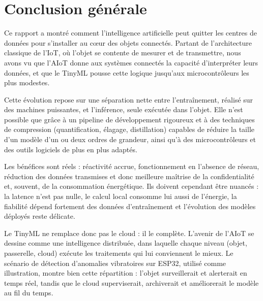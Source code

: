 \chapter*{Conclusion générale}

Ce rapport a montré comment l'intelligence artificielle peut quitter les
centres de données pour s'installer au cœur des objets connectés. Partant de
l'architecture classique de l'IoT, où l'objet se contente de mesurer et de
transmettre, nous avons vu que l'AIoT donne aux systèmes connectés la capacité
d'interpréter leurs données, et que le TinyML pousse cette logique jusqu'aux
microcontrôleurs les plus modestes.

Cette évolution repose sur une séparation nette entre l'entraînement, réalisé
sur des machines puissantes, et l'inférence, seule exécutée dans l'objet. Elle
n'est possible que grâce à un pipeline de développement rigoureux et à des
techniques de compression (quantification, élagage, distillation) capables de
réduire la taille d'un modèle d'un ou deux ordres de grandeur, ainsi qu'à des
microcontrôleurs et des outils logiciels de plus en plus adaptés.

Les bénéfices sont réels : réactivité accrue, fonctionnement en l'absence de
réseau, réduction des données transmises et donc meilleure maîtrise de la
confidentialité et, souvent, de la consommation énergétique. Ils doivent
cependant être nuancés : la latence n'est pas nulle, le calcul local consomme
lui aussi de l'énergie, la fiabilité dépend fortement des données
d'entraînement et l'évolution des modèles déployés reste délicate.

Le TinyML ne remplace donc pas le cloud : il le complète. L'avenir de l'AIoT se
dessine comme une intelligence distribuée, dans laquelle chaque niveau (objet,
passerelle, cloud) exécute les traitements qui lui conviennent le mieux. Le
scénario de détection d'anomalies vibratoires sur ESP32, utilisé comme
illustration, montre bien cette répartition : l'objet surveillerait et
alerterait en temps réel, tandis que le cloud superviserait, archiverait
et améliorerait le modèle au fil du temps.
